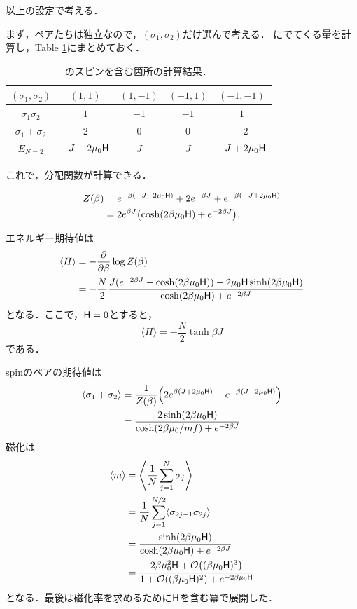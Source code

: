 	以上の設定で考える．

	まず，ペアたちは独立なので，$(\sigma_1, \sigma_2)$だけ選んで考える．
	にでてくる量を計算し，Table \ref{tab:exchange_interaction}にまとめておく．
	\begin{table}[tbp]
			\centering
			\caption{のスピンを含む箇所の計算結果．}
			\begin{tabular}{c|cccc}\hline
					$(\sigma_1, \sigma_2)$ & $(1, 1)$ & $(1, -1)$ & $(-1, 1)$ & $(-1, -1)$\\\hline
					$\sigma_1\sigma_2$ & $1$ & $-1$ & $-1$ & $1$\\
					$\sigma_1 + \sigma_2$ & $2$ & $0$ & $0$ & $-2$\\
					$E_{N=2}$ & $-J-2\mu_0\mathsf{H}$ & $J$ & $J$ & $-J+2\mu_0\mathsf{H}$\\\hline
			\end{tabular}
			\label{tab:exchange_interaction}
	\end{table}

	これで，分配関数が計算できる．

	\begin{align}
			Z(\beta) &= e^{-\beta(-J - 2\mu_0\mathsf{H})} + 2e^{-\beta J} + e^{-\beta(-J+2\mu_0\mathsf{H})}\\
					 &= 2e^{\beta J}\qty(\cosh(2\beta\mu_0 \mathsf{H}) + e^{-2\beta J}).
	\end{align}

	エネルギー期待値は
	\begin{align}
			\langle H \rangle &= -\pdv{}{\beta}\log Z(\beta)\\
							  &= -\frac{N}{2}\frac{J(e^{-2\beta J} - \cosh(2\beta\mu_0\mathsf{H})) - 2\mu_0\mathsf{H}\sinh(2\beta\mu_0 \mathsf{H})}{\cosh(2\beta\mu_0\mathsf{H}) + e^{-2\beta J}}
	\end{align}
	となる．ここで，$\mathsf{H} = 0$とすると，
	\begin{equation}
			\langle H \rangle = -\frac{N}{2}\tanh\beta J
	\end{equation}
	である．

	spinのペアの期待値は
	\begin{align}
			\langle \sigma_1 + \sigma_2\rangle &= \frac{1}{Z(\beta)}\qty(2e^{\beta(J + 2\mu_0\mathsf{H})} - e^{-\beta(J-2\mu_0\mathsf{H})})\\
										&= \frac{2\sinh(2\beta \mu_0 \mathsf{H})}{\cosh(2\beta\mu_0 /mf) + e^{-2\beta J}}
	\end{align}
	磁化は
	\begin{align}
			\langle m \rangle &= \left\langle \frac{1}{N}\sum_{j = 1}^{N}\sigma_j\right\rangle\\
							  &= \frac{1}{N}\sum_{j = 1}^{N/2}\langle \sigma_{2j-1}\sigma_{2j}\rangle\\
							  &= \frac{\sinh(2\beta\mu_0\mathsf{H})}{\cosh(2\beta\mu_0\mathsf{H}) + e^{-2\beta J}}\\
							  &= \frac{2\beta\mu_0^2\mathsf{H} + \mathcal{O}\qty((\beta\mu_0\mathsf{H})^3)}{1 + \mathcal{O}\qty((\beta\mu_0\mathsf{H})^2) + e^{-2\beta\mu_0\mathsf{H}}}
	\end{align}
	となる．最後は磁化率を求めるために$\mathsf{H}$を含む冪で展開した．

